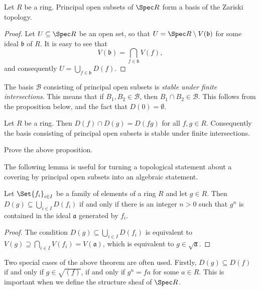 \begin{proposition}
	Let $R$ be a ring.	Principal open subsets of $\Spec R$ form a basis of the Zariski topology.
\end{proposition}
\begin{proof}
	Let $U \subseteq \Spec R$ be an open set, so that $U = \Spec R \setminus V(\mathfrak{b})$ for some ideal $\mathfrak{b}$ of $R$. It is easy to see that
	\begin{equation*}
		V(\mathfrak{b}) = \bigcap_{f \in \mathfrak{b}} V(f),
	\end{equation*}
	and consequently $U = \bigcup_{f \in \mathfrak{b}} D(f)$.
\end{proof}

The basis $\mathcal{B}$ consisting of principal open subsets is \textit{stable under finite intersections}. This means that if $B_1, B_2 \in \mathcal{B}$, then $B_1 \cap B_2 \in \mathcal{B}$. This follows from the proposition below, and the fact that $D(0) = \emptyset$.

\begin{proposition}\label{chap2:principal-open-is-basis}
	Let $R$ be a ring. Then $D(f) \cap D(g) = D(fg)$ for all $f, g\in R$. Consequently the basis consisting of principal open subsets is stable under finite intersections.
\end{proposition}
\begin{exercise}
	Prove the above proposition.
\end{exercise}

The following lemma is useful for turning a topological statement about a covering by principal open subsets into an algebraic statement.

\begin{lemma}\label{chap2:covering-trick}
	Let $\Set{f_i}_{i \in I}$ be a family of elements of a ring $R$ and let $g \in R$. Then $D(g) \subseteq \bigcup_{i \in I}D(f_i)$ if and only if there is an integer $n >0$ such that $g^n$ is contained in the ideal $\mathfrak{a}$ generated by $f_i$.
\end{lemma}
\begin{proof}
	The condition $D(g) \subseteq \bigcup_{i \in I}D(f_i)$ is equivalent to $V(g) \supseteq \bigcap_{i \in I} V(f_i) = V(\mathfrak{a})$, which is equivalent to $g \in \sqrt{\mathfrak{a}}$.
\end{proof}

Two special cases of the above theorem are often used. Firstly, $D(g) \subseteq D(f)$ if and only if $g \in \sqrt{(f)}$, if and only if $g^n = fa$ for some $a \in R$. This is important when we define the structure sheaf of $\Spec R$. 

